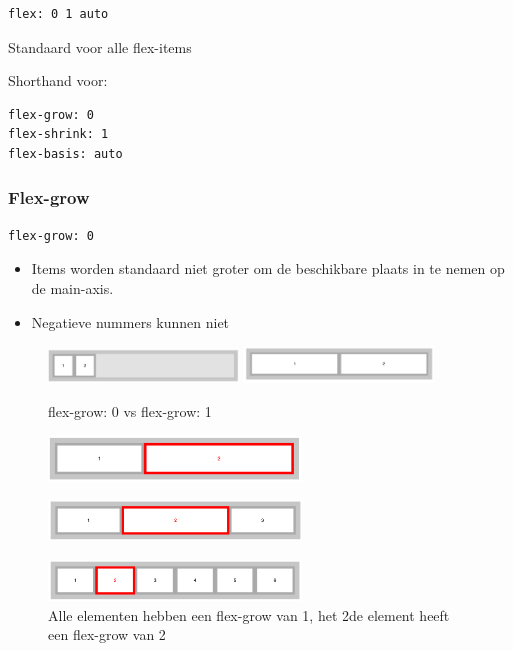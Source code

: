 \documentclass{article}
\begin{document}
\begin{lstlisting}
flex: 0 1 auto
\end{lstlisting}
Standaard voor alle flex-items

Shorthand voor:
\begin{lstlisting}
flex-grow: 0
flex-shrink: 1
flex-basis: auto
\end{lstlisting}

\subsubsection{Flex-grow}
\begin{lstlisting}
flex-grow: 0
\end{lstlisting}

\begin{itemize}
    \item Items worden standaard niet groter om de beschikbare plaats in te nemen op de main-axis.
    \item Negatieve nummers kunnen niet
\end{itemize}

\begin{figure}[H]
    \centering
    \includegraphics[width=0.45\textwidth]{img/Screenshot_20200427_101411.png}
    \includegraphics[width=0.45\textwidth]{img/Screenshot_20200427_101400.png}
    \caption{flex-grow: 0 vs flex-grow: 1}
\end{figure}


\begin{figure}[H]
    \centering
    \includegraphics[width=0.6\textwidth]{img/Screenshot_20200502_195208.png}
    
\end{figure}
\begin{figure}[H]
    \centering
    \includegraphics[width=0.6\textwidth]{img/Screenshot_20200502_195358.png}
\end{figure}
\begin{figure}[H]
    \centering
    \includegraphics[width=0.6\textwidth]{img/Screenshot_20200502_195446.png}
    \caption{Alle elementen hebben een flex-grow van 1, het 2de element heeft een flex-grow van 2}
\end{figure}
\end{document}
